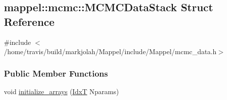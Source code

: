 \hypertarget{structmappel_1_1mcmc_1_1MCMCDataStack}{}\subsection{mappel\+:\+:mcmc\+:\+:M\+C\+M\+C\+Data\+Stack Struct Reference}
\label{structmappel_1_1mcmc_1_1MCMCDataStack}


{\ttfamily \#include $<$/home/travis/build/markjolah/\+Mappel/include/\+Mappel/mcmc\+\_\+data.\+h$>$}

\subsubsection*{Public Member Functions}
\begin{DoxyCompactItemize}
\item 
void \hyperlink{structmappel_1_1mcmc_1_1MCMCDataStack_ab0699a869938cbf728f3e901328e4104}{initialize\+\_\+arrays} (\hyperlink{namespacemappel_ab17ec0f30b61ece292439d7ece81d3a8}{IdxT} Nparams)
\end{DoxyCompactItemize}
